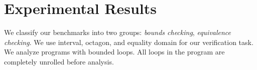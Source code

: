 \section{Experimental Results}
We classify our benchmarks into two groups: {\em bounds checking}, 
{\em equivalence checking}.  We use interval, octagon, and equality 
domain for our verification task.  We analyze programs with bounded 
loops.  All loops in the program are completely unrolled before analysis.
  
